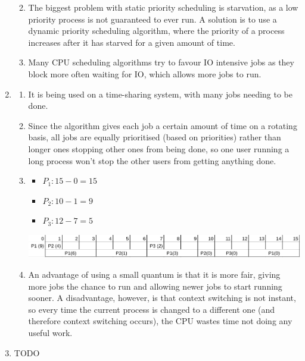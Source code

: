 \documentclass[12pt]{article}
\begin{document}
\begin{enumerate}
\begin{enumerate}
\begin{itemize}
                    \end{itemize}
              \item The biggest problem with static priority scheduling is starvation, as a low priority process is not guaranteed to ever run. A solution is to use a dynamic priority scheduling algorithm, where the priority of a process increases after it has starved for a given amount of time.
              \item Many CPU scheduling algorithms try to favour IO intensive jobs as they block more often waiting for IO, which allows more jobs to run.
          \end{enumerate}
    \item \begin{enumerate}
              \item It is being used on a time-sharing system, with many jobs needing to be done.
              \item Since the algorithm gives each job a certain amount of time on a rotating basis, all jobs are equally prioritised (based on priorities) rather than longer ones stopping other ones from being done, so one user running a long process won't stop the other users from getting anything done.
              \item \begin{itemize}
                        \item $P_1: 15 - 0 = 15$
                        \item $P_2: 10 - 1 = 9$
                        \item $P_3: 12 - 7 = 5$
                    \end{itemize}
                    \includegraphics[scale=0.4]{1-roundrobin.png}
              \item An advantage of using a small quantum is that it is more fair, giving more jobs the chance to run and allowing newer jobs to start running sooner. A disadvantage, however, is that context switching is not instant, so every time the current process is changed to a different one (and therefore context switching occurs), the CPU wastes time not doing any useful work.
          \end{enumerate}
    \item TODO
\end{enumerate}
\end{document}
